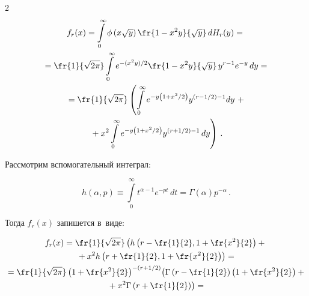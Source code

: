 \begin{multicols}{2}
\begin{multline*}
f_r(x)=\int\limits_{0}^{\infty} \phi\left(x\sqrt{y}\right) 

\fr{1-x^{2}y}{\sqrt{y}}\, dH_r(y) ={}\\

     {}=\fr{1}{\sqrt{2\pi}}\int\limits_{0}^{\infty} e^{-({x^{2}y})/{2}} 

     \fr{1-x^{2}y}{\sqrt{y}}\, y^{r-1} e^{-y}\, dy = {}\\

     {}=\fr{1}{\sqrt{2\pi}}\left(\int\limits_{0}^{\infty} e^{-y\left(1+

     {x^{2}}/{2}\right)} y^{\left(r-1/2\right)-1}dy \right. +{}\\

     \left. {}+ x^{2}\int\limits_{0}^{\infty} e^{-y\left(1+{x^{2}}/{2}\right)} 

     y^{\left(r+1/2\right)-1}\, dy \right)\,.

\end{multline*}

Рассмотрим вспомогательный интеграл:

\begin{equation*}

h(\alpha, p) \equiv\int\limits_{0}^{\infty}t^{\alpha-1}e^{-pt}\,dt=


      \Gamma(\alpha)p^{-\alpha}\,.

\end{equation*}

Тогда $f_r(x)$ запишется в~виде:

\begin{multline*}

f_r(x)  =\fr{1}{\sqrt{2\pi}}  \left(h\left(r-\fr{1}{2}, 1+

\fr{x^{2}}{2}\right)+{}\right.\\

\left.{} +x^{2}h\left(r+\fr{1}{2}, 1+\fr{x^{2}}{2}\right)\right) =     {}\\

{}=\fr{1}{\sqrt{2\pi}} \left(1+\fr{x^{2}}{2}\right)^{-\left(r+{1}/{2}\right)}

  \!\left(\Gamma\left(r-\fr{1}{2}\right)\left(1+\fr{x^{2}}{2}\right)+{}\right.\\

  \left.{}+x^{2}\Gamma\left(

  r+\fr{1}{2}\right)\right) = {}\\


\end{multline*}
\end{multicols}

